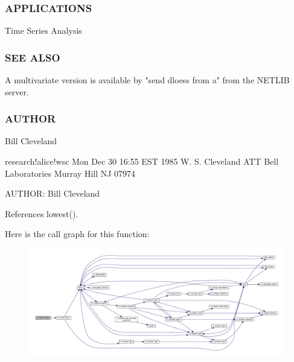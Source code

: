 \subsubsection*{A\+P\+P\+L\+I\+C\+A\+T\+I\+O\+NS}

\begin{DoxyVerb} Time Series Analysis
\end{DoxyVerb}


\subsubsection*{S\+EE A\+L\+SO}

\begin{DoxyVerb}A multivariate version is available by "send dloess from a"
from the NETLIB server.
\end{DoxyVerb}


\subsubsection*{A\+U\+T\+H\+OR}

\begin{DoxyVerb}Bill Cleveland

 research!alice!wsc Mon Dec 30 16:55 EST 1985
 W. S. Cleveland
 ATT Bell Laboratories
 Murray Hill NJ 07974 \end{DoxyVerb}


A\+U\+T\+H\+OR\+: Bill Cleveland 

References lowest().

Here is the call graph for this function\+:
\nopagebreak
\begin{figure}[H]
\begin{center}
\leavevmode
\includegraphics[width=350pt]{namespacem__math_a8e38b0954bb4c1f27985fb430912f281_cgraph}
\end{center}
\end{figure}
\mbox{\label{namespacem__math_a06b587e00199906f1f87f1a7b101d71f}} 
